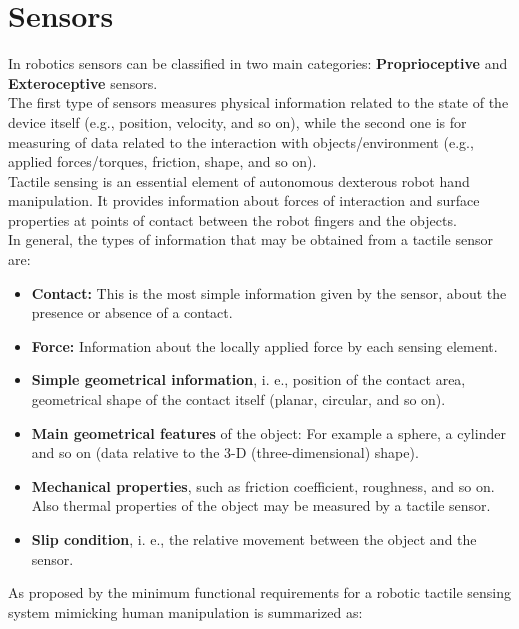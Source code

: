 \documentclass[a4paper, 10pt, conference]{ieeeconf}      %
\begin{document}
\section{\textbf{Sensors}}
In robotics sensors can be classified in two main categories: \textbf{Proprioceptive} and \textbf{Exteroceptive} sensors.\\
The first type of sensors measures physical information related to the state of the device itself (e.g., position, velocity, and so on), while the second one is for measuring of data related to the interaction with objects/environment (e.g., applied forces/torques, friction, shape, and so on).\\
Tactile sensing is an essential element of autonomous dexterous robot hand manipulation. It provides information about forces of interaction and surface properties at points of contact between the robot fingers and the objects.\\
In general, the types of information that may be obtained from a tactile sensor are:\\
\begin{itemize}
	\item \textbf{Contact:} This is the most simple information given by the sensor, about the presence or absence of a contact.
	\item \textbf{Force:} Information about the locally applied force by each sensing element.
	\item \textbf{Simple geometrical information}, i. e., position of the contact area, geometrical shape of the contact itself (planar, circular, and so on).
	\item \textbf{Main geometrical features} of the object: For example a sphere, a cylinder and so on (data relative to the 3-D (three-dimensional) shape).
	\item \textbf{Mechanical properties}, such as friction coefficient, roughness, and so on. Also thermal properties of the object may be measured by a tactile sensor.
	\item \textbf{Slip condition}, i. e., the relative movement between the object and the sensor.
\end{itemize}
As proposed by \cite{yousef2011tactile} the minimum functional requirements for a robotic tactile sensing system mimicking human manipulation is summarized as:\\
\end{document}
